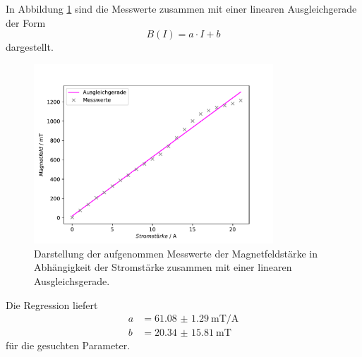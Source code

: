  In Abbildung \ref{fig:Magnetfeld} sind die Messwerte zusammen mit einer linearen Ausgleichgerade der
 Form
 \begin{equation}
     B(I) = a \cdot I + b
 \end{equation} \noindent
 dargestellt.
 \begin{figure}[H]
     \centering
     \includegraphics[width=0.8\textwidth]{Auswertung/Magnetfeld.pdf}
     \caption{Darstellung der aufgenommen Messwerte der Magnetfeldstärke in Abhängigkeit der Stromstärke zusammen
     mit einer linearen Ausgleichsgerade.}
     \label{fig:Magnetfeld}
 \end{figure} \noindent
 Die Regression liefert
 \begin{align}
     a &= \SI{61.08(129)}{\milli\tesla\per\ampere} \\
     b &= \SI{20.34(1581)}{\milli\tesla}
 \end{align} \noindent
 für die gesuchten Parameter.

